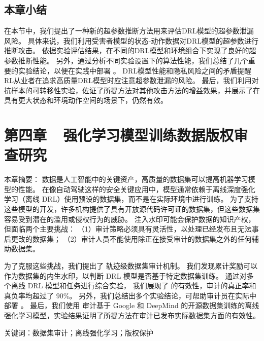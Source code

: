 \section{本章小结}
在本节中，我们提出了一种新的超参数推断方法用来评估DRL模型的超参数泄漏风险。
具体来说，我们利用受害者模型的状态-动作数据对DRL模型的超参数进行推断攻击。
依据实验评估结果，\sysname 在不同的DRL模型和环境组合下实现了良好的超参数推断性能。
另外，通过分析不同实验设置下的算法性能，我们总结了几个重要的实验结论，以便在实践中部署 \sysname。
DRL模型性能和隐私风险之间的矛盾提醒RL从业者在追求高质量DRL模型时应注意超参数泄漏的风险。
最后，我们利用对抗样本的可转移性实验，佐证了所提方法对其他攻击方法的增益效果，并展示了在具有更大状态和环境动作空间的场景下，\sysname 仍然有效。



\chapter{第四章~~强化学习模型训练数据版权审查研究}

本章摘要：
数据是人工智能中的关键资产，高质量的数据集可以提高机器学习模型的性能。
在像自动驾驶这样的安全关键应用中，模型通常依赖于离线深度强化学习（离线 DRL）使用预设的数据集，而不是在实际环境中进行训练。
为了支持这些模型的开发，许多机构提供了具有开放源代码许可证的数据集，但这些数据集容易受到潜在的滥用或侵权行为的威胁。
注入水印可能会保护数据的知识产权，但面临两个主要挑战：
（1）审计策略必须具有灵活性，以处理已经发布且无法事后更改的数据集；
（2）审计人员不能使用除正在接受审计的数据集之外的任何辅助数据集。

为了克服这些挑战，我们提出了 \sysnameo 轨迹级数据集审计机制。
我们发现累计奖励可以作为数据集的内生水印，以判断 DRL 模型是否基于特定数据集训练。
通过对多个离线 DRL 模型和任务进行综合实验，
我们展现了 \sysnameo 的有效性，审计的真正率和真负率均超过了 $90\%$。
另外，我们总结出多个实验结论，可帮助审计员在实际中部署 \sysnameo 。
最后，我们使用 \sysnameo 审计基于 Google 和 DeepMind 的开源数据集训练的离线强化学习模型，实验结果证明了所提方法在审计已发布实际数据集方面的有效性。

关键词：数据集审计；离线强化学习；版权保护

